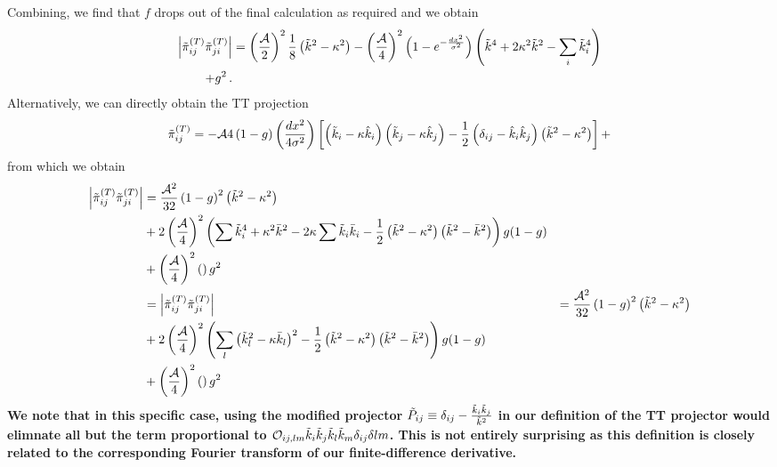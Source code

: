 \documentclass{revtex4}
\begin{document}
Combining, we find that $f$ drops out of the final calculation as required and we obtain
\begin{align}
  \left|\tilde{\pi}^{(T)}_{ij}\tilde{\pi}_{ji}^{(T)}\right| &= \left(\frac{\mathcal{A}}{2}\right)^2\frac{1}{8}\left(\tilde{k}^2-\kappa^2\right)
  - \left(\frac{\mathcal{A}}{4}\right)^2\left(1-e^{-\frac{dx^2}{\sigma^2}}\right)\left(\tilde{k}^4+2\kappa^2\tilde{k}^2-\sum_i\tilde{k}_i^4\right) \notag \\
  + g^2 \, .
\end{align}
Alternatively, we can directly obtain the TT projection
\begin{equation}
  \tilde{\pi}_{ij}^{(T)} = -\mathcal{\mathcal{A}}{4}\left(1-g\right)\left(\frac{dx^2}{4\sigma^2}\right)\left[\left(\tilde{k}_i-\kappa\hat{k}_i\right)\left(\tilde{k}_j-\kappa\hat{k}_j\right) - \frac{1}{2}\left(\delta_{ij}-\hat{k}_i\hat{k}_j\right)\left(\tilde{k}^2-\kappa^2\right)\right] + 
\end{equation}
from which we obtain
\begin{align}
  \left|\tilde{\pi}^{(T)}_{ij}\tilde{\pi}_{ji}^{(T)}\right| &= \frac{\mathcal{A}^2}{32}\left(1-g\right)^2\left(\tilde{k}^2-\kappa^2\right) \\
  &+ 2\left(\frac{\mathcal{A}}{4}\right)^2\left(\sum\tilde{k}_i^4 + \kappa^2\bar{k}^2 - 2\kappa\sum\tilde{k}_i\bar{k}_i - \frac{1}{2}\left(\tilde{k}^2-\kappa^2\right)\left(\tilde{k}^2-\bar{k}^2\right) \right)g(1-g) \\
  &+ \left(\frac{\mathcal{A}}{4}\right)^2\left(\right)g^2 \\
  &= 
  \left|\tilde{\pi}^{(T)}_{ij}\tilde{\pi}_{ji}^{(T)}\right| &= \frac{\mathcal{A}^2}{32}\left(1-g\right)^2\left(\tilde{k}^2-\kappa^2\right) \\
  &+ 2\left(\frac{\mathcal{A}}{4}\right)^2\left(\sum_l\left(\tilde{k}_l^2-\kappa\bar{k}_l\right)^2 - \frac{1}{2}\left(\tilde{k}^2-\kappa^2\right)\left(\tilde{k}^2-\bar{k}^2\right) \right)g(1-g) \\
  &+ \left(\frac{\mathcal{A}}{4}\right)^2\left(\right)g^2
\end{align}
{\bf We note that in this specific case, using the modified projector $\tilde{P}_{ij}\equiv \delta_{ij} - \frac{\tilde{k}_i\tilde{k}_j}{\tilde{k}^2}$ in our definition of the TT projector would elimnate all but the term proportional to $\mathcal{O}_{ij,lm}\tilde{k}_i\tilde{k}_j\tilde{k}_l\tilde{k}_m\delta_{ij}\delta{lm}$.  This is not entirely surprising as this definition is closely related to the corresponding Fourier transform of our finite-difference derivative.}
\end{document}
